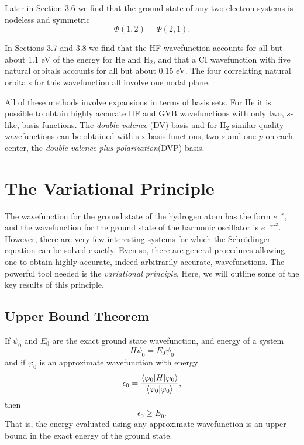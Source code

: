 Later in Section 3.6 we find that the ground state of any two electron 
systems is nodeless and symmetric
\begin{equation}
\Phi (1 , 2) = \Phi (2 , 1).
\end{equation}

In Sections 3.7 and 3.8 we find that the HF wavefunction accounts for
all but about 1.1 eV of the energy for He and H$_2$, and that a CI
wavefunction with five natural orbitals accounts for all but about
0.15 eV. The four correlating natural orbitals for this wavefunction
all involve one nodal plane.

All of these methods involve expansions in terms of basis sets. For He
it is possible to obtain highly accurate HF and GVB wavefunctions with
only two, $s$-like, basis functions. The \emph{double valence} (DV)
basis and for H$_2$ similar quality wavefunctions can be obtained with
six basis functions, two $s$ and one $p$ on each center, the
\emph{double valence plus polarization}(DVP) basis.

\section{The Variational Principle}

The wavefunction for the ground state of the hydrogen atom has the
form $e^{-r}$, and the wavefunction for the ground state of the
harmonic oscillator is $e^{- \alpha r^2}$.  However, there are very
few interesting systems for which the Schr\"odinger equation can be
solved exactly. Even so, there are general procedures allowing one to
obtain highly accurate, indeed arbitrarily accurate,
wavefunctions. The powerful tool needed is the \emph{variational
principle}. Here, we will outline some of the key results of this
principle.

\subsection{Upper Bound Theorem}

If $\psi_0$ and $E_0$ are the exact ground state wavefunction, and energy 
of a system
\begin{equation}
H \psi_0 = E_0 \psi_0
\end{equation}
and if $\varphi_0$ is an approximate wavefunction with energy
\begin{equation}
\epsilon_0 = {\langle \varphi_0 \vert H \vert \varphi_0 \rangle 
\over \langle \varphi_0 \vert \varphi_0 \rangle} ,
\end{equation}
then
\begin{equation}
\epsilon_0 \geq E_0 .
\label{chap3-eqno3}
\end{equation}
That is, the energy evaluated using any approximate wavefunction is an 
upper bound in the exact energy of the ground state.

